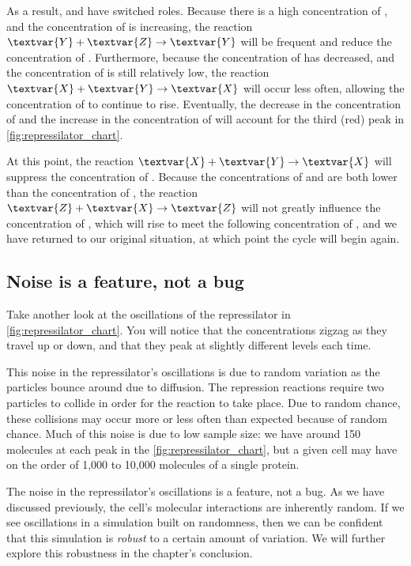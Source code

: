 As a result,  and  have switched roles. Because there is a high concentration of , and the concentration of  is increasing, the reaction $\textvar{Y} + \textvar{Z} \rightarrow \textvar{Y}$ will be frequent and reduce the concentration of . Furthermore, because the concentration of  has decreased, and the concentration of  is still relatively low, the reaction $\textvar{X} + \textvar{Y} \rightarrow \textvar{X}$ will occur less often, allowing the concentration of  to continue to rise. Eventually, the decrease in the concentration of  and the increase in the concentration of  will account for the third (red) peak in \autoref{fig:repressilator_chart}.

At this point, the reaction $\textvar{X} + \textvar{Y} \rightarrow \textvar{X}$ will suppress the concentration of . Because the concentrations of  and  are both lower than the concentration of , the reaction $\textvar{Z} + \textvar{X} \rightarrow \textvar{Z}$ will not greatly influence the concentration of , which will rise to meet the following concentration of , and we have returned to our original situation, at which point the cycle will begin again.

\FloatBarrier
{}
\subsection{Noise is a feature, not a bug}

Take another look at the oscillations of the repressilator in \autoref{fig:repressilator_chart}. You will notice that the concentrations zigzag as they travel up or down, and that they peak at slightly different levels each time.

This noise in the repressilator's oscillations is due to random variation as the particles bounce around due to diffusion. The repression reactions require two particles to collide in order for the reaction to take place. Due to random chance, these collisions may occur more or less often than expected because of random chance. Much of this noise is due to low sample size: we have around 150 molecules at each peak in the \autoref{fig:repressilator_chart}, but a given cell may have on the order of 1,000 to 10,000 molecules of a single protein.

The noise in the repressilator's oscillations is a feature, not a bug. As we have discussed previously, the cell's molecular interactions are inherently random. If we see oscillations in a simulation built on randomness, then we can be confident that this simulation is \textit{robust} to a certain amount of variation. We will further explore this robustness in the chapter's conclusion.\\

